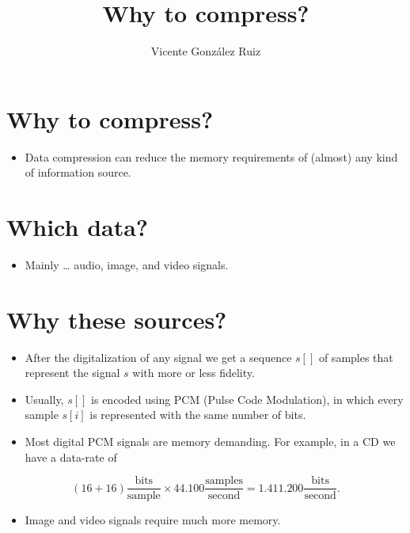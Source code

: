 
\title{Why to compress?}
\author{Vicente González Ruiz}

\maketitle

\section{Why to compress?}
\begin{itemize}
\item Data compression can reduce the memory requirements of (almost) any kind of information source.
\end{itemize}

\section{Which data?}\label{which-data}
\begin{itemize}
\item Mainly \ldots{} audio, image, and video signals.
\end{itemize}

\section{Why these sources?}

\begin{itemize}
\item After the digitalization of any signal we get a sequence \(s[]\) of samples that represent the signal \(s\) with more or less fidelity.
\item Usually, \(s[]\) is encoded using PCM (Pulse Code Modulation), in which every sample \(s[i]\) is represented with the same number of bits.
\item Most digital PCM signals are memory demanding. For example, in a CD we have a data-rate of
\end{itemize}

\begin{equation}
  (16+16)\frac{\text{bits}}{\text{sample}}\times
  44{.}100\frac{\text{samples}}{\text{second}}=
  1{.}411{.}200\frac{\text{bits}}{\text{second}}.
\end{equation}

\begin{itemize}
\item Image and video signals require much more memory.
\end{itemize}

